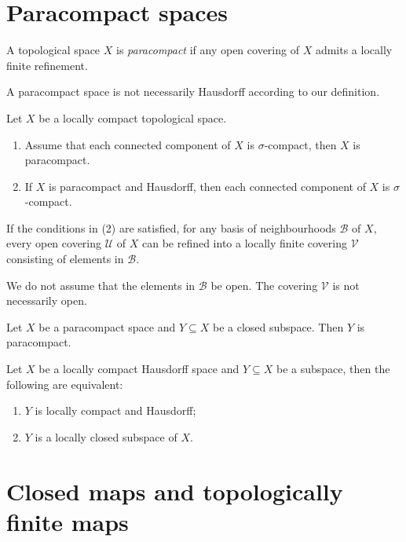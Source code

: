 \section{Paracompact spaces}

\begin{definition}
    A topological space $X$ is \emph{paracompact} if any open covering of $X$ admits a locally finite refinement.
\end{definition}
A paracompact space is not necessarily Hausdorff according to our definition.

\begin{proposition}\label{prop-paracptrefinement}
    Let $X$ be a locally compact topological space. 
    \begin{enumerate}
        \item Assume that each connected component of $X$ is $\sigma$-compact, then $X$ is paracompact.
        \item If $X$ is paracompact and Hausdorff, then each connected component of $X$ is $\sigma$-compact.
    \end{enumerate}
    If the conditions in (2) are satisfied, for any basis of neighbourhoods $\mathcal{B}$ of $X$, every open covering $\mathcal{U}$ of $X$ can be refined into a locally finite covering $\mathcal{V}$ consisting of elements in $\mathcal{B}$.
\end{proposition}
We do not assume that the elements in $\mathcal{B}$ be open. The covering $\mathcal{V}$ is not necessarily open.

\begin{proposition}
    Let $X$ be a paracompact space and $Y\subseteq X$ be a closed subspace. Then $Y$ is paracompact.
\end{proposition}

\begin{proposition}
    Let $X$ be a locally compact Hausdorff space and $Y\subseteq X$ be a subspace, then the following are equivalent:
    \begin{enumerate}
        \item $Y$ is locally compact and Hausdorff;
        \item $Y$ is a locally closed subspace of $X$.
    \end{enumerate}
    
\end{proposition}

\section{Closed maps and topologically finite maps}


